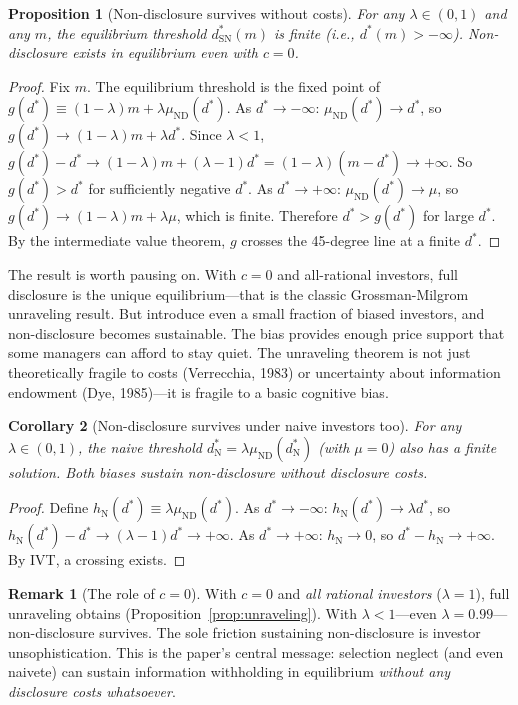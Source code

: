 \documentclass[12pt]{article}
\theoremstyle{plain}
\newtheorem{proposition}{Proposition}
\newtheorem{corollary}[proposition]{Corollary}
\theoremstyle{definition}
\newtheorem{remark}{Remark}
\newcommand{\ND}{\mathrm{ND}}
\newcommand{\SN}{\mathrm{SN}}
\newcommand{\N}{\mathrm{N}}
\begin{document}
\begin{proposition}[Non-disclosure survives without costs]
\label{prop:existence}
For any $\lambda \in (0, 1)$ and any $m$, the equilibrium threshold $d^*_\SN(m)$ is finite (i.e., $d^*(m) > -\infty$). Non-disclosure exists in equilibrium even with $c = 0$.
\end{proposition}

\begin{proof}
Fix $m$. The equilibrium threshold is the fixed point of $g(d^*) \equiv (1-\lambda)m + \lambda\mu_{\ND}(d^*)$. As $d^* \to -\infty$: $\mu_{\ND}(d^*) \to d^*$, so $g(d^*) \to (1-\lambda)m + \lambda d^*$. Since $\lambda < 1$, $g(d^*) - d^* \to (1-\lambda)m + (\lambda - 1)d^* = (1-\lambda)(m - d^*) \to +\infty$. So $g(d^*) > d^*$ for sufficiently negative $d^*$. As $d^* \to +\infty$: $\mu_{\ND}(d^*) \to \mu$, so $g(d^*) \to (1-\lambda)m + \lambda\mu$, which is finite. Therefore $d^* > g(d^*)$ for large $d^*$. By the intermediate value theorem, $g$ crosses the 45-degree line at a finite $d^*$.
\end{proof}

The result is worth pausing on. With $c = 0$ and all-rational investors, full disclosure is the unique equilibrium---that is the classic Grossman-Milgrom unraveling result. But introduce even a small fraction of biased investors, and non-disclosure becomes sustainable. The bias provides enough price support that some managers can afford to stay quiet. The unraveling theorem is not just theoretically fragile to costs (Verrecchia, 1983) or uncertainty about information endowment (Dye, 1985)---it is fragile to a basic cognitive bias.

\begin{corollary}[Non-disclosure survives under naive investors too]
\label{cor:naive_nd}
For any $\lambda \in (0, 1)$, the naive threshold $d^*_\N = \lambda\mu_{\ND}(d^*_\N)$ (with $\mu = 0$) also has a finite solution. Both biases sustain non-disclosure without disclosure costs.
\end{corollary}

\begin{proof}
Define $h_\N(d^*) \equiv \lambda\mu_{\ND}(d^*)$. As $d^* \to -\infty$: $h_\N(d^*) \to \lambda d^*$, so $h_\N(d^*) - d^* \to (\lambda - 1)d^* \to +\infty$. As $d^* \to +\infty$: $h_\N \to 0$, so $d^* - h_\N \to +\infty$. By IVT, a crossing exists.
\end{proof}

\begin{remark}[The role of $c = 0$]
\label{rmk:c_zero}
With $c = 0$ and \emph{all rational investors} ($\lambda = 1$), full unraveling obtains (Proposition~\ref{prop:unraveling}). With $\lambda < 1$---even $\lambda = 0.99$---non-disclosure survives. The sole friction sustaining non-disclosure is investor unsophistication. This is the paper's central message: selection neglect (and even naivete) can sustain information withholding in equilibrium \emph{without any disclosure costs whatsoever}.
\end{remark}
\end{document}
